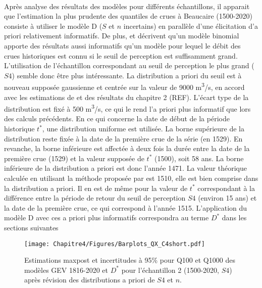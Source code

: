 	\paragraph{} Après analyse des résultats des modèles pour différents échantillons, il apparait que l'estimation la plus prudente des quantiles de crues à Beaucaire (1500-2020) consiste à utiliser le modèle D ($S$ et $n$ incertains) en parallèle d'une élicitation d'a priori relativement informatifs. De plus, \citet{stedinger_flood_1986} et \citet{payrastre_usefulness_2011} décrivent qu'un modèle binomial apporte des résultats aussi informatifs qu'un modèle pour lequel le débit des crues historiques est connu si le seuil de perception est suffisamment grand. L'utilisation de l'échantillon correspondant au seuil de perception le plus grand ($S4$) semble donc être plus intéressante. La distribution a priori du seuil est à nouveau supposée gaussienne et centrée sur la valeur de 9000 m\textsuperscript{3}/s, en accord avec les estimations de \citet{pichard_hydro-climatology_2017} et des résultats du chapitre 2 (REF). L'écart type de la distribution est fixé à 500 m\textsuperscript{3}/s, ce qui le rend l'a priori plus informatif que lors des calculs précédents. En ce qui concerne la date de début de la période historique $t^{*}$, une distribution uniforme est utilisée. La borne supérieure de la distribution reste fixée à la date de la première crue de la série (en 1529). En revanche, la borne inférieure est affectée à deux fois la durée entre la date de la première crue (1529) et la valeur supposée de $t^{*}$ (1500), soit 58 ans. La borne inférieure de la distribution a priori est donc l'année 1471. La valeur théorique calculée en utilisant la méthode proposée par \citet{prosdocimi_german_2018} est 1510, elle est bien comprise dans la distribution a priori. Il en est de même pour la valeur de $t^{*}$ correspondant à la différence entre la période de retour du seuil de perception $S4$ (environ 15 ans) et la date de la première crue, ce qui correspond à l'année 1515. L'application du modèle D avec ces a priori plus informatifs correspondra au terme $D^*$ dans les sections suivantes

	\begin{figure}[h]
		\centering
		\texttt{[image: Chapitre4/Figures/Barplots\_QX\_C4short.pdf]}
		\caption{Estimations maxpost et incertitudes à 95\% pour Q100 et Q1000 des modèles GEV 1816-2020 et $D^*$ pour l'échantillon 2 (1500-2020, $S4$) après révision des distributions a priori de $S4$ et $n$.}
		\label{fig:BarplotC4short}
	\end{figure}

